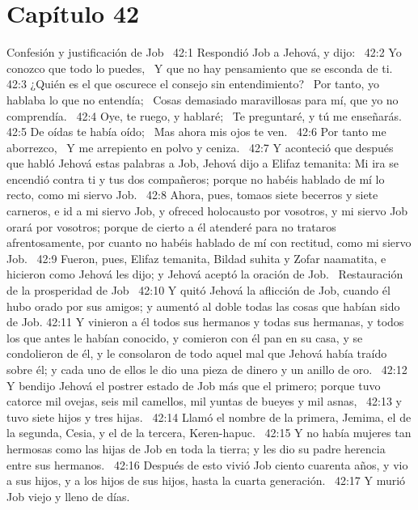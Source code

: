 \section*{Capítulo 42 }

Confesión y justificación de Job  
42:1 Respondió Job a Jehová, y dijo:  
42:2 Yo conozco que todo lo puedes,  
Y que no hay pensamiento que se esconda de ti.  
42:3 ¿Quién es el que oscurece el consejo sin entendimiento?  
Por tanto, yo hablaba lo que no entendía;  
Cosas demasiado maravillosas para mí, que yo no comprendía.  
42:4 Oye, te ruego, y hablaré;  
Te preguntaré, y tú me enseñarás. 
42:5 De oídas te había oído;  
Mas ahora mis ojos te ven.  
42:6 Por tanto me aborrezco,  
Y me arrepiento en polvo y ceniza.  
42:7 Y aconteció que después que habló Jehová estas palabras a Job, Jehová dijo a Elifaz temanita: Mi ira se encendió contra ti y tus dos compañeros; porque no habéis hablado de mí lo recto, como mi siervo Job.  
42:8 Ahora, pues, tomaos siete becerros y siete carneros, e id a mi siervo Job, y ofreced holocausto por vosotros, y mi siervo Job orará por vosotros; porque de cierto a él atenderé para no trataros afrentosamente, por cuanto no habéis hablado de mí con rectitud, como mi siervo Job.  
42:9 Fueron, pues, Elifaz temanita, Bildad suhita y Zofar naamatita, e hicieron como Jehová les dijo; y Jehová aceptó la oración de Job.  
Restauración de la prosperidad de Job  
42:10 Y quitó Jehová la aflicción de Job, cuando él hubo orado por sus amigos; y aumentó al doble todas las cosas que habían sido de Job. 
42:11 Y vinieron a él todos sus hermanos y todas sus hermanas, y todos los que antes le habían conocido, y comieron con él pan en su casa, y se condolieron de él, y le consolaron de todo aquel mal que Jehová había traído sobre él; y cada uno de ellos le dio una pieza de dinero y un anillo de oro.  
42:12 Y bendijo Jehová el postrer estado de Job más que el primero; porque tuvo catorce mil ovejas, seis mil camellos, mil yuntas de bueyes y mil asnas,  
42:13 y tuvo siete hijos y tres hijas.  
42:14 Llamó el nombre de la primera, Jemima, el de la segunda, Cesia, y el de la tercera, Keren-hapuc.  
42:15 Y no había mujeres tan hermosas como las hijas de Job en toda la tierra; y les dio su padre herencia entre sus hermanos.  
42:16 Después de esto vivió Job ciento cuarenta años, y vio a sus hijos, y a los hijos de sus hijos, hasta la cuarta generación.  
42:17 Y murió Job viejo y lleno de días.